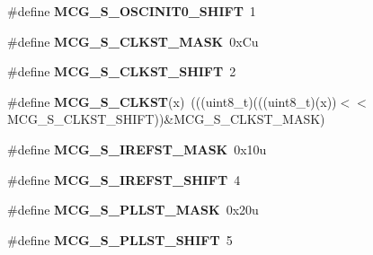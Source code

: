 \begin{DoxyCompactItemize}
\item 
\mbox{\label{group___m_c_g___register___masks_ga3680bc3a628991bb5279d9d6b938b374}} 
\#define {\bfseries M\+C\+G\+\_\+\+S\+\_\+\+O\+S\+C\+I\+N\+I\+T0\+\_\+\+S\+H\+I\+FT}~1
\item 
\mbox{\label{group___m_c_g___register___masks_gaf43507c78cdda211a04b5ae0509edb2e}} 
\#define {\bfseries M\+C\+G\+\_\+\+S\+\_\+\+C\+L\+K\+S\+T\+\_\+\+M\+A\+SK}~0x\+Cu
\item 
\mbox{\label{group___m_c_g___register___masks_gab0768a667adb2dc2e1fb7972f9fd85a4}} 
\#define {\bfseries M\+C\+G\+\_\+\+S\+\_\+\+C\+L\+K\+S\+T\+\_\+\+S\+H\+I\+FT}~2
\item 
\mbox{\label{group___m_c_g___register___masks_ga891e8f2d733bebc7ab21cf49e0473b24}} 
\#define {\bfseries M\+C\+G\+\_\+\+S\+\_\+\+C\+L\+K\+ST}(x)~(((uint8\+\_\+t)(((uint8\+\_\+t)(x))$<$$<$M\+C\+G\+\_\+\+S\+\_\+\+C\+L\+K\+S\+T\+\_\+\+S\+H\+I\+FT))\&M\+C\+G\+\_\+\+S\+\_\+\+C\+L\+K\+S\+T\+\_\+\+M\+A\+SK)
\item 
\mbox{\label{group___m_c_g___register___masks_ga5bf822a90d9c1e67d5297420157e1dd0}} 
\#define {\bfseries M\+C\+G\+\_\+\+S\+\_\+\+I\+R\+E\+F\+S\+T\+\_\+\+M\+A\+SK}~0x10u
\item 
\mbox{\label{group___m_c_g___register___masks_ga4a2727883c339845e709dacc0c2fd71a}} 
\#define {\bfseries M\+C\+G\+\_\+\+S\+\_\+\+I\+R\+E\+F\+S\+T\+\_\+\+S\+H\+I\+FT}~4
\item 
\mbox{\label{group___m_c_g___register___masks_ga6f176d95968a5b7b1af67ae81734c854}} 
\#define {\bfseries M\+C\+G\+\_\+\+S\+\_\+\+P\+L\+L\+S\+T\+\_\+\+M\+A\+SK}~0x20u
\item 
\mbox{\label{group___m_c_g___register___masks_gafddddab311f8f0cb58e7b7941f6d9a8d}} 
\#define {\bfseries M\+C\+G\+\_\+\+S\+\_\+\+P\+L\+L\+S\+T\+\_\+\+S\+H\+I\+FT}~5
\item 
\mbox{\label{group___m_c_g___register___masks_ga6cb486757d45c5211baa3b130e720b97}} 
$$
\end{DoxyCompactItemize}
